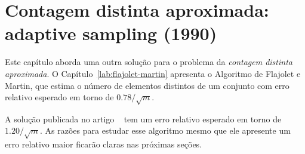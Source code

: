 \chapter{Contagem distinta aproximada: adaptive sampling (1990)}

Este capítulo aborda uma outra solução para o problema da \textit{contagem distinta aproximada}. O 
Capítulo~\ref{lab:flajolet-martin} apresenta o Algoritmo de Flajolet e Martin, que estima o número de elementos 
distintos de um conjunto com erro relativo esperado em torno de $0.78 / \sqrt{m}$. 

A solução publicada no artigo ~\citep{adptive:sampling:90} tem um erro relativo esperado em torno de $1.20 / \sqrt{m}$.
As razões para estudar esse algoritmo mesmo que ele apresente um erro relativo maior ficarão claras nas próximas seções.